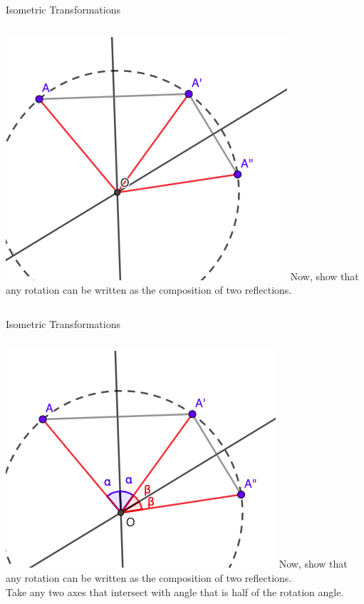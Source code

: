 \documentclass{beamer}
\begin{document}
\begin{frame}{Isometric Transformations}
	\begin{columns}
		\includegraphics[scale=0.4]{iso14.png}
		Now, show that any rotation can be written as the 
		composition of two reflections.
	\end{columns}
\end{frame}
\begin{frame}{Isometric Transformations}
	\begin{columns}
		\column{0.6\textwidth}
		\includegraphics[scale=0.4]{iso15.png}
		\column{0.4\textwidth}
		Now, show that any rotation can be written as the 
		composition of two reflections.\\
		\phantom{Spacing}
		Take any two axes that intersect with angle that is
		half of the rotation angle.
	\end{columns}
\end{frame}
\end{document}
